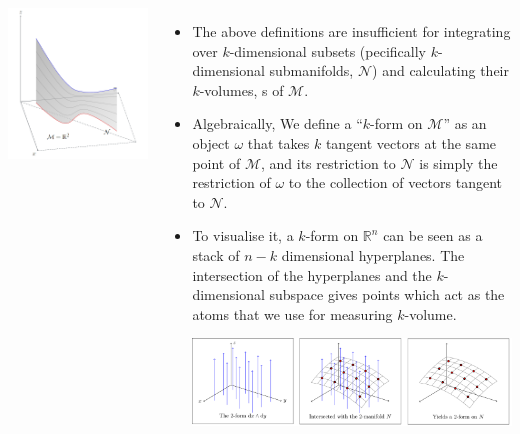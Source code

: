 \documentclass[20pt,margin=1in,innermargin=-4.5in,blockverticalspace=-0.25in]{tikzposter}
\begin{document}
\begin{columns}
{\begin{center}
                \includegraphics[scale=0.35]{otherformsmotiv.png}
            \end{center}
            \begin{itemize}
                \item The above definitions are insufficient for integrating over $k$-dimensional subsets (pecifically $k$-dimensional submanifolds, $\mathcal{N}$) and calculating their $k$-volumes, s of $\mathcal{M}$. 
                \item Algebraically, We define a “\( k \)-form on \( \mathcal{M} \)” as an object \( \omega \) that takes \( k \) tangent vectors at the same point of \( \mathcal{M} \), and its restriction to \( \mathcal{N} \) is simply the restriction of \( \omega \) to the collection of vectors tangent to \( \mathcal{N} \).
                \item To visualise it, a $k$-form on $\mathbb{R}^n$ can be seen as a stack of $n-k$ dimensional hyperplanes. The intersection of the hyperplanes and the $k$-dimensional subspace gives points which act as the atoms that we use for measuring $k$-volume.
                \begin{center}
                    \includegraphics[scale=0.8]{2formsinr3.png} \qquad \qquad

\end{center}
\end{itemize}}
\end{columns}
\end{document}
